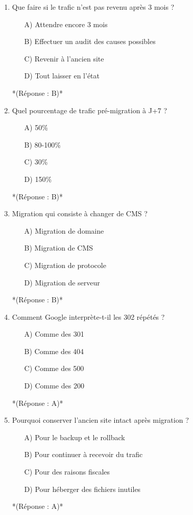 \documentclass[12pt,a4paper,twoside]{report}
\begin{document}
\begin{enumerate}
\item Que faire si le trafic n'est pas revenu après 3 mois ?
\begin{itemize}
\item[A)] Attendre encore 3 mois
\item[B)] Effectuer un audit des causes possibles
\item[C)] Revenir à l'ancien site
\item[D)] Tout laisser en l'état
\end{itemize}
*(Réponse : B)*

\item Quel pourcentage de trafic pré-migration à J+7 ?
\begin{itemize}
\item[A)] 50\%
\item[B)] 80-100\%
\item[C)] 30\%
\item[D)] 150\%
\end{itemize}
*(Réponse : B)*

\item Migration qui consiste à changer de CMS ?
\begin{itemize}
\item[A)] Migration de domaine
\item[B)] Migration de CMS
\item[C)] Migration de protocole
\item[D)] Migration de serveur
\end{itemize}
*(Réponse : B)*

\item Comment Google interprète-t-il les 302 répétés ?
\begin{itemize}
\item[A)] Comme des 301
\item[B)] Comme des 404
\item[C)] Comme des 500
\item[D)] Comme des 200
\end{itemize}
*(Réponse : A)*

\item Pourquoi conserver l'ancien site intact après migration ?
\begin{itemize}
\item[A)] Pour le backup et le rollback
\item[B)] Pour continuer à recevoir du trafic
\item[C)] Pour des raisons fiscales
\item[D)] Pour héberger des fichiers inutiles
\end{itemize}
*(Réponse : A)*


\end{enumerate}
\end{document}
